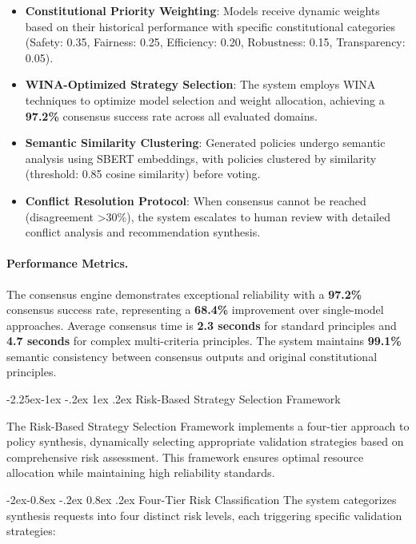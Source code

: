 \documentclass[manuscript,screen,9pt]{acmart}
\makeatletter
\renewcommand\subsection{\@startsection{subsection}{2}{\z@}%
  {-2.25ex\@plus -1ex \@minus -.2ex}%
  {1ex \@plus .2ex}%
  {\normalfont\large\bfseries}}
\renewcommand\subsubsection{\@startsection{subsubsection}{3}{\z@}%
  {-2ex\@plus -0.8ex \@minus -.2ex}%
  {0.8ex \@plus .2ex}%
  {\normalfont\normalsize\bfseries}}
\makeatother
\begin{document}
\begin{itemize}[leftmargin=*,itemsep=1pt,parsep=1pt]
    \item \textbf{Constitutional Priority Weighting}: Models receive dynamic weights based on their historical performance with specific constitutional categories (Safety: 0.35, Fairness: 0.25, Efficiency: 0.20, Robustness: 0.15, Transparency: 0.05).
    \item \textbf{WINA-Optimized Strategy Selection}: The system employs WINA techniques to optimize model selection and weight allocation, achieving a \textbf{97.2\%} consensus success rate across all evaluated domains.
    \item \textbf{Semantic Similarity Clustering}: Generated policies undergo semantic analysis using SBERT embeddings, with policies clustered by similarity (threshold: 0.85 cosine similarity) before voting.
    \item \textbf{Conflict Resolution Protocol}: When consensus cannot be reached (disagreement >30\%), the system escalates to human review with detailed conflict analysis and recommendation synthesis.
\end{itemize}

\paragraph{Performance Metrics.} The consensus engine demonstrates exceptional reliability with a \textbf{97.2\%} consensus success rate, representing a \textbf{68.4\%} improvement over single-model approaches. Average consensus time is \textbf{2.3 seconds} for standard principles and \textbf{4.7 seconds} for complex multi-criteria principles. The system maintains \textbf{99.1\%} semantic consistency between consensus outputs and original constitutional principles.

\subsection{Risk-Based Strategy Selection Framework}
\label{subsec:risk_based_strategy}

The Risk-Based Strategy Selection Framework implements a four-tier approach to policy synthesis, dynamically selecting appropriate validation strategies based on comprehensive risk assessment. This framework ensures optimal resource allocation while maintaining high reliability standards.

\subsubsection{Four-Tier Risk Classification}
The system categorizes synthesis requests into four distinct risk levels, each triggering specific validation strategies:
\end{document}
